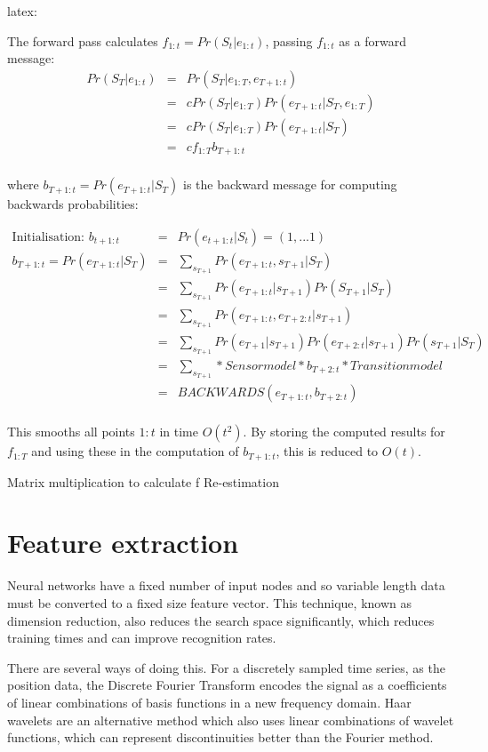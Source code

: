 \documentclass[12pt,a4,notitlepage]{report}
\renewcommand{\_}{\texttt{\symbol{95}}}
\newcommand{\<}{\texttt{\symbol{60}}}
\renewcommand{\>}{\texttt{\symbol{62}}}
\begin{document}
{latex:

The forward pass calculates $f_{1:t} = Pr(S_t|e_{1:t})$, passing $f_{1:t}$ as a forward message:
\begin{eqnarray*}
Pr(S_T | e_{1:t}) &=& Pr(S_T | e_{1:T}, e_{T+1:t}) \\
&=& c Pr(S_T | e_{1:T}) Pr(e_{T+1:t} | S_T,e_{1:T}) \\
&=& c Pr(S_T | e_{1:T}) Pr(e_{T+1:t} | S_T) \\
&=& c f_{1:T} b_{T+1:t} \\
\end{eqnarray*}
			
where $b_{T+1:t} = Pr(e_{T+1:t}|S_T)$ is the backward message for computing backwards probabilities:

\begin{eqnarray*}
\mbox{Initialisation: }b_{t+1:t} &=& Pr(e_{t+1:t}|S_t) = (1,...1) \\
b_{T+1:t} 	= Pr(e_{T+1:t}|S_T) &=&  \sum_{s_{T+1}} Pr(e_{T+1:t}, s_{T+1} | S_T) \\
						&=& \sum_{s_{T+1}} Pr(e_{T+1:t} | s_{T+1}) Pr(S_{T+1} | S_T) \\
						&=& \sum_{s_{T+1}} Pr(e_{T+1:t}, e_{T+2:t} | s_{T+1}) \\
						&=& \sum_{s_{T+1}} Pr(e_{T+1} | s_{T+1}) Pr(e_{T+2:t} | s_{T+1}) Pr(s_{T+1}|S_T) \\
						&=& \sum_{s_{T+1}} * Sensor model * b_{T+2:t} * Transition model \\
						&=& BACKWARDS(e_{T+1:t}, b_{T+2:t}) \\
\end{eqnarray*}

This smooths all points $1:t$ in time $O(t^2)$. By storing the computed results for $f_{1:T}$ and using these in the computation of $b_{T+1:t}$, this is reduced to $O(t)$.

Matrix multiplication to calculate f
Re-estimation

\section{Feature extraction}

Neural networks have a fixed number of input nodes and so variable length data must be converted to a fixed size feature vector. This technique, known as dimension reduction, also reduces the search space significantly, which reduces training times and can improve recognition rates.

There are several ways of doing this. For a discretely sampled time series, as the position data, the Discrete Fourier Transform encodes the signal as a coefficients of linear combinations of basis functions in a new frequency domain. Haar wavelets are an alternative method which also uses linear combinations of wavelet functions, which can represent discontinuities better than the Fourier method.

}
\end{document}

